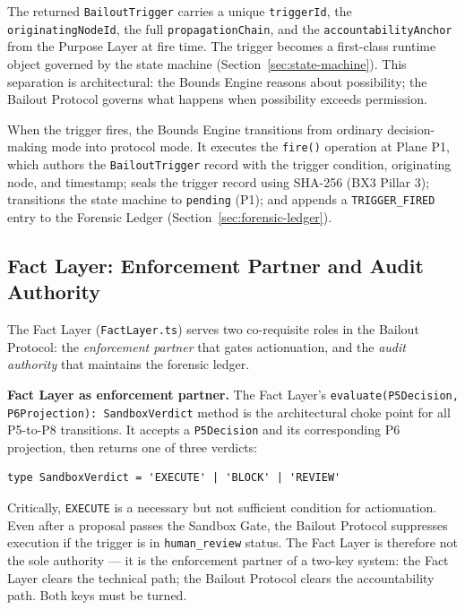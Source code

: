 \documentclass[12pt]{article}
\begin{document}
The returned \texttt{BailoutTrigger} carries a unique \texttt{triggerId}, the \texttt{originatingNodeId}, the full \texttt{propagationChain}, and the \texttt{accountabilityAnchor} from the Purpose Layer at fire time. The trigger becomes a first-class runtime object governed by the state machine (Section~\ref{sec:state-machine}). This separation is architectural: the Bounds Engine reasons about possibility; the Bailout Protocol governs what happens when possibility exceeds permission.

When the trigger fires, the Bounds Engine transitions from ordinary decision-making mode into protocol mode. It executes the \texttt{fire()} operation at Plane P1, which authors the \texttt{BailoutTrigger} record with the trigger condition, originating node, and timestamp; seals the trigger record using SHA-256 (BX3 Pillar 3); transitions the state machine to \texttt{pending} (P1); and appends a \texttt{TRIGGER\_FIRED} entry to the Forensic Ledger (Section~\ref{sec:forensic-ledger}).

\subsection{Fact Layer: Enforcement Partner and Audit Authority}
\label{sec:fact-layer-enforcement}

The Fact Layer (\texttt{FactLayer.ts}) serves two co-requisite roles in the Bailout Protocol: the \emph{enforcement partner} that gates actionuation, and the \emph{audit authority} that maintains the forensic ledger.

\bigskip
\noindent\textbf{Fact Layer as enforcement partner.} The Fact Layer's \texttt{evaluate(P5Decision, P6Projection): SandboxVerdict} method is the architectural choke point for all P5-to-P8 transitions. It accepts a \texttt{P5Decision} and its corresponding P6 projection, then returns one of three verdicts:

\begin{verbatim}
type SandboxVerdict = 'EXECUTE' | 'BLOCK' | 'REVIEW'
\end{verbatim}

Critically, \texttt{EXECUTE} is a necessary but not sufficient condition for actionuation. Even after a proposal passes the Sandbox Gate, the Bailout Protocol suppresses execution if the trigger is in \texttt{human\_review} status. The Fact Layer is therefore not the sole authority --- it is the enforcement partner of a two-key system: the Fact Layer clears the technical path; the Bailout Protocol clears the accountability path. Both keys must be turned.
\end{document}
